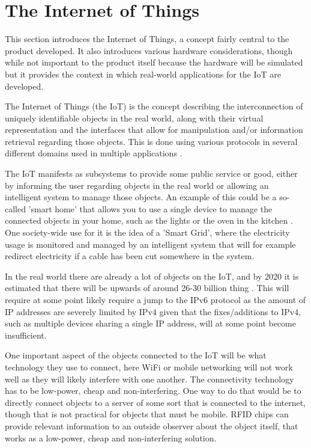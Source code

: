 \section{The Internet of Things}
This section introduces the Internet of Things, a concept fairly central to the product developed. It also introduces various hardware considerations, though while not important to the product itself because the hardware will be simulated but it provides the context in which real-world applications for the IoT are developed.

The Internet of Things (the IoT) is the concept describing the interconnection of uniquely identifiable objects in the real world, along with their virtual representation and the interfaces that allow for manipulation and/or information retrieval regarding those objects.
This is done using various protocols in several different domains used in multiple applications \citep{misc:InternetOfThingsDefinition} \citep{misc:InternetOfThingsDefinition2} \citep{misc:InternetOfThingsDefinition3}.

The IoT manifests as subsystems to provide some public service or good, either by informing the user regarding objects in the real world or allowing an intelligent system to manage those objects.
An example of this could be a so-called 'smart home' that allows you to use a single device to manage the connected objects in your home, such as the lights or the oven in the kitchen \citep{misc:InternetOfThingsExamples}.
One society-wide use for it is the idea of a 'Smart Grid', where the electricity usage is monitored and managed by an intelligent system that will for example redirect electricity if a cable has been cut somewhere in the system\citep{misc:smartGrid}.

In the real world there are already a lot of objects on the IoT, and by 2020 it is estimated that there will be upwards of around 26-30 billion thing \citep{misc:IoTGrowth1}\citep{misc:IoTGrowth2}.
This will require at some point likely require a jump to the IPv6 protocol as the amount of IP addresses are severely limited by IPv4\citep{misc:numberOfAddresses} given that the fixes/additions to IPv4, such as multiple devices sharing a single IP address, will at some point become insufficient.

One important aspect of the objects connected to the IoT will be what technology they use to connect, here WiFi or mobile networking will not work well as they will likely interfere with one another.
The connectivity technology has to be low-power, cheap and non-interfering.
One way to do that would be to directly connect objects to a server of some sort that is connected to the internet, though that is not practical for objects that must be mobile.
RFID chips can provide relevant information to an outside observer about the object itself, that works as a low-power, cheap and non-interfering solution\citep{misc:rfid}.

